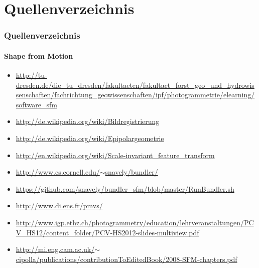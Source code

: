 \documentclass{beamer}
\begin{document}
\section{Quellenverzeichnis}
\begin{frame}
	\frametitle{Quellenverzeichnis}
	\framesubtitle{Shape from Motion}
	
	\begin{tiny}
	\begin{itemize}
		\item \href{http://tu-dresden.de/die\_tu\_dresden/fakultaeten/fakultaet\_forst\_geo\_und\_hydrowissenschaften/fachrichtung\_geowissenschaften/ipf/photogrammetrie/elearning/software\_sfm}{http://tu-dresden.de/die\_tu\_dresden/fakultaeten/fakultaet\_forst\_geo\_und\_hydrowissenschaften/fachrichtung\_geowissenschaften/ipf/photogrammetrie/elearning/software\_sfm}
		\item \href{http://de.wikipedia.org/wiki/Bildregistrierung}{http://de.wikipedia.org/wiki/Bildregistrierung}
		\item \href{http://de.wikipedia.org/wiki/Epipolargeometrie}{http://de.wikipedia.org/wiki/Epipolargeometrie}
		\item \href{http://en.wikipedia.org/wiki/Scale-invariant_feature_transform}{http://en.wikipedia.org/wiki/Scale-invariant\_feature\_transform}
		\item \href{http://www.cs.cornell.edu/~snavely/bundler/}{http://www.cs.cornell.edu/$\sim$snavely/bundler/}
		\item \href{https://github.com/snavely/bundler_sfm/blob/master/RunBundler.sh}{https://github.com/snavely/bundler\_sfm/blob/master/RunBundler.sh}
		\item \href{http://www.di.ens.fr/pmvs/}{http://www.di.ens.fr/pmvs/}
		\item \href{http://www.igp.ethz.ch/photogrammetry/education/lehrveranstaltungen/PCV_HS12/content_folder/PCV-HS2012-slides-multiview.pdf}{http://www.igp.ethz.ch/photogrammetry/education/lehrveranstaltungen/PCV\_HS12/content\_folder/PCV-HS2012-slides-multiview.pdf}
		\item \href{http://mi.eng.cam.ac.uk/~cipolla/publications/contributionToEditedBook/2008-SFM-chapters.pdf}{http://mi.eng.cam.ac.uk/$\sim$cipolla/publications/contributionToEditedBook/2008-SFM-chapters.pdf}
	\end{itemize}
	\end{tiny}
\end{frame}
\end{document}
